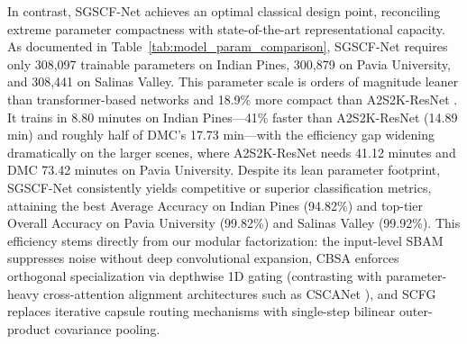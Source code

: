 \documentclass[manuscript,screen,review]{acmart}
\begin{document}
In contrast, SGSCF-Net achieves an optimal classical design point, reconciling extreme parameter compactness with state-of-the-art representational capacity. As documented in Table~\ref{tab:model_param_comparison}, SGSCF-Net requires only 308,097 trainable parameters on Indian Pines, 300,879 on Pavia University, and 308,441 on Salinas Valley. This parameter scale is orders of magnitude leaner than transformer-based networks and 18.9\% more compact than A2S2K-ResNet \cite{roy2020attention}. It trains in 8.80 minutes on Indian Pines---41\% faster than A2S2K-ResNet (14.89 min) and roughly half of DMC's 17.73 min---with the efficiency gap widening dramatically on the larger scenes, where A2S2K-ResNet needs 41.12 minutes and DMC 73.42 minutes on Pavia University. Despite its lean parameter footprint, SGSCF-Net consistently yields competitive or superior classification metrics, attaining the best Average Accuracy on Indian Pines (94.82\%) and top-tier Overall Accuracy on Pavia University (99.82\%) and Salinas Valley (99.92\%). This efficiency stems directly from our modular factorization: the input-level SBAM suppresses noise without deep convolutional expansion, CBSA enforces orthogonal specialization via depthwise 1D gating (contrasting with parameter-heavy cross-attention alignment architectures such as CSCANet \cite{wang2023cscanet}), and SCFG replaces iterative capsule routing mechanisms \cite{paoletti2018capsule, wang2021deep} with single-step bilinear outer-product covariance pooling.
\end{document}
